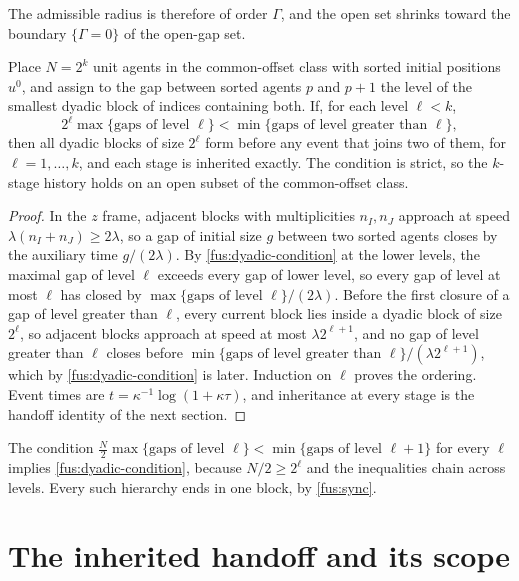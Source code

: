 The admissible radius is therefore of order $\Gamma$, and the open set
shrinks toward the boundary $\{\Gamma=0\}$ of the open-gap set.

Place $N=2^k$ unit agents in the common-offset class with sorted initial
positions $u^0$, and assign to the gap between sorted agents $p$ and $p+1$
the level of the smallest dyadic block of indices containing both. If, for
each level $\ell<k$,
\begin{equation}
 2^\ell\max\{\text{gaps of level }\ell\}
 <\min\{\text{gaps of level greater than }\ell\},
 \label{fus:dyadic-condition}
\end{equation}
then all dyadic blocks of size $2^\ell$ form before any event that joins two
of them, for $\ell=1,\ldots,k$, and each stage is inherited exactly. The
condition is strict, so the $k$-stage history holds on an open subset of the
common-offset class.
\begin{proof}
In the $z$ frame, adjacent blocks with multiplicities $n_I,n_J$ approach at
speed $\lambda(n_I+n_J)\geq2\lambda$, so a gap of initial size $g$ between
two sorted agents closes by the auxiliary time $g/(2\lambda)$. By
\cref{fus:dyadic-condition} at the lower levels, the maximal gap of level
$\ell$ exceeds every gap of lower level, so every gap of level at most
$\ell$ has closed by $\max\{\text{gaps of level }\ell\}/(2\lambda)$. Before
the first closure of a gap of level greater than $\ell$, every current block
lies inside a dyadic block of size $2^\ell$, so adjacent blocks approach at
speed at most $\lambda2^{\ell+1}$, and no gap of level greater than $\ell$
closes before $\min\{\text{gaps of level greater than }\ell\}/(\lambda2^{\ell+1})$,
which by \cref{fus:dyadic-condition} is later. Induction on $\ell$ proves
the ordering. Event times are $t=\kappa^{-1}\log(1+\kappa\tau)$, and
inheritance at every stage is the handoff identity of the next section.
\end{proof}

The condition $\frac N2\max\{\text{gaps of level }\ell\}<\min\{\text{gaps of
level }\ell+1\}$ for every $\ell$ implies \cref{fus:dyadic-condition},
because $N/2\geq2^\ell$ and the inequalities chain across levels. Every such
hierarchy ends in one block, by \cref{fus:sync}.

\section{The inherited handoff and its scope}

